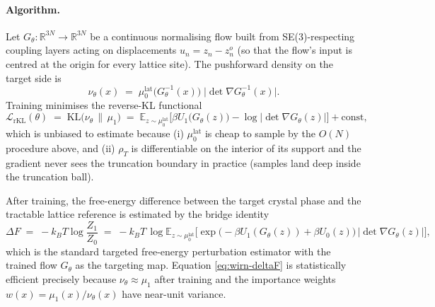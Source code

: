 \documentclass[11pt,letterpaper]{article}
\newcommand{\E}{\mathbb{E}}
\newcommand{\Real}{\mathbb{R}}
\newcommand{\KLdiv}{\mathrm{KL}}
\theoremstyle{plain}
\begin{document}
\paragraph{Algorithm.} Let $G_\theta:\Real^{3N}\to\Real^{3N}$ be a
continuous normalising flow built from SE(3)-respecting coupling layers
acting on displacements $u_n = z_n - z^o_n$ (so that the flow's input is
centred at the origin for every lattice site). The pushforward density on
the target side is
\begin{equation}\label{eq:wirn-nu}
  \nu_\theta(x) \;=\; \mu_0^{\mathrm{lat}}\!\big(G_\theta^{-1}(x)\big)\;\big|\det \nabla G_\theta^{-1}(x)\big|.
\end{equation}
Training minimises the reverse-KL functional
\begin{equation}\label{eq:wirn-loss}
  \mathcal L_{\mathrm{rKL}}(\theta) \;=\; \KLdiv\!\big(\nu_\theta\,\big\|\,\mu_1\big)
  \;=\; \E_{z\sim\mu_0^{\mathrm{lat}}}\!\Big[\beta U_1\!\big(G_\theta(z)\big)
        - \log\big|\det\nabla G_\theta(z)\big|\Big] + \mathrm{const},
\end{equation}
which is unbiased to estimate because (i) $\mu_0^{\mathrm{lat}}$ is cheap
to sample by the $O(N)$ procedure above, and (ii) $\rho_T$ is
differentiable on the interior of its support and the gradient never sees
the truncation boundary in practice (samples land deep inside the
truncation ball).

After training, the free-energy difference between the target crystal
phase and the tractable lattice reference is estimated by the bridge
identity
\begin{equation}\label{eq:wirn-deltaF}
  \Delta F \;=\; -k_B T \log\frac{Z_1}{Z_0}
  \;=\; -k_B T\,\log\E_{z\sim\mu_0^{\mathrm{lat}}}\!\Big[\exp\!\big(-\beta U_1(G_\theta(z)) + \beta U_0(z)\big)\,\big|\det\nabla G_\theta(z)\big|\Big],
\end{equation}
which is the standard targeted free-energy perturbation estimator with the
trained flow $G_\theta$ as the targeting map. Equation
\eqref{eq:wirn-deltaF} is statistically efficient precisely because
$\nu_\theta\approx\mu_1$ after training and the importance weights
$w(x)=\mu_1(x)/\nu_\theta(x)$ have near-unit variance.
\end{document}
